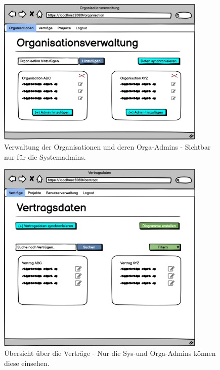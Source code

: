 \begin{figure}[h]
\centering
\includegraphics[width=10cm]{img/mockup_web/system-admin-orgs.png}
\caption{Verwaltung der Organisationen und deren Orga-Admins - Sichtbar nur für die Systemadmins.}
\end{figure}

\begin{figure}[h]
\centering
\includegraphics[width=10cm]{img/mockup_web/admin-vertraege.png}
\caption{Übersicht über die Verträge - Nur die Sys-und Orga-Admins können diese einsehen.}
\end{figure}

